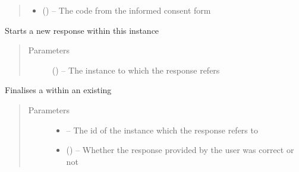 \documentclass[letterpaper,10pt,english]{sphinxmanual}
\begin{document}
\begin{fulllineitems}
\begin{fulllineitems}
\begin{quote}
\begin{description}
\begin{itemize}
\item {} 
 (\href{https://docs.python.org/2/library/string.html\#module-string}{}) -- The code from the informed consent form

\end{itemize}

\end{description}\end{quote}

\end{fulllineitems}


\begin{fulllineitems}
\label{\detokenize{user:user.User.start_response}}
Starts a new response within this instance
\begin{quote}\begin{description}
\item[{Parameters}] \leavevmode
{} ({\hyperref[\detokenize{instance:instance.Instance}]{}}) -- The instance to which the response refers

\end{description}\end{quote}

\end{fulllineitems}


\begin{fulllineitems}
\label{\detokenize{user:user.User.validate}}
Finalises a  within an existing 
\begin{quote}\begin{description}
\item[{Parameters}] \leavevmode\begin{itemize}
\item {} 
 -- The id of the instance which the response refers to

\item {} 
 () -- Whether the response provided by the user was correct or not

\end{itemize}

\end{description}\end{quote}

\end{fulllineitems}


\end{fulllineitems}
\end{document}
